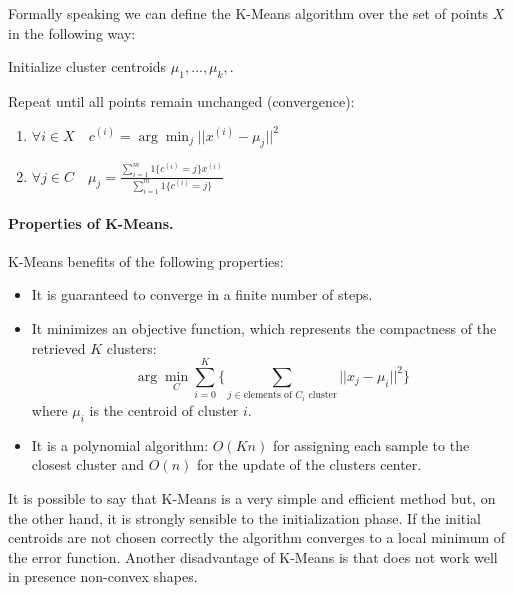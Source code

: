 \newpage
Formally speaking we can define the K-Means algorithm over the set of points $X$ in the following way:
\begin{enumerate}
		\begin{enumerate}[label*=\arabic*.]
			\item  $\forall i\in X \quad c^{(i)} = \arg\min_j \vert\vert x^{(i)}-\mu_j\vert\vert^2$
			\item $\forall j\in C \quad \mu_j = \frac{\sum_{i=1}^m 1\{c^{(i)} = j\}x^{(i)}}{\sum_{i=1}^m 1\{c^{(i)} = j\}}$
		\end{enumerate}
\end{enumerate}

\paragraph*{Properties of K-Means.} K-Means benefits of the following properties:
\begin{itemize}
	\item It is guaranteed to converge in a finite number of steps.
	\item It minimizes an objective function, which represents the compactness of the retrieved $K$ clusters:
	$$\arg \min_C\sum_{i=0}^K \Biggl\{ \sum_{j \in \text{elements of } C_i\text{ cluster}} ||x_j - \mu_i||^2 \Biggr\}$$
	where $\mu_i$ is the centroid of cluster $i$.
	\item It is a polynomial algorithm: $O(Kn)$ for assigning each sample to the closest cluster and $O(n)$ for the update of the clusters center.
\end{itemize}
It is possible to say that K-Means is a very simple and efficient method but, on the other hand, it is strongly sensible to the initialization phase. If the initial centroids are not chosen correctly the algorithm converges to a local minimum of the error function. Another disadvantage of K-Means is that does not work well in presence non-convex shapes. 


